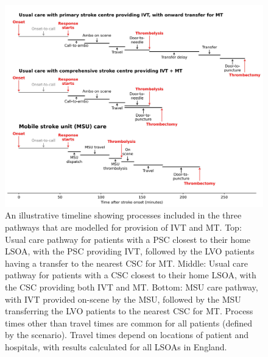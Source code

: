 \begin{figure}[h]
    \centering
    \includegraphics[width=0.85\linewidth]{images/stroke_treatment.jpg}
    \caption{An illustrative timeline showing processes included in the three pathways that are modelled for provision of IVT and MT. Top: Usual care pathway for patients with a PSC closest to their home LSOA, with the PSC providing IVT, followed by the LVO patients having a transfer to the nearest CSC for MT. Middle: Usual care pathway for patients with a CSC closest to their home LSOA, with the CSC providing both IVT and MT. Bottom: MSU care pathway, with IVT provided on-scene by the MSU, followed by the MSU transferring the LVO patients to the nearest CSC for MT. Process times other than travel times are common for all patients (defined by the scenario). Travel times depend on locations of patient and hospitals, with results calculated for all LSOAs in England.}
    \label{fig:process}
\end{figure}

